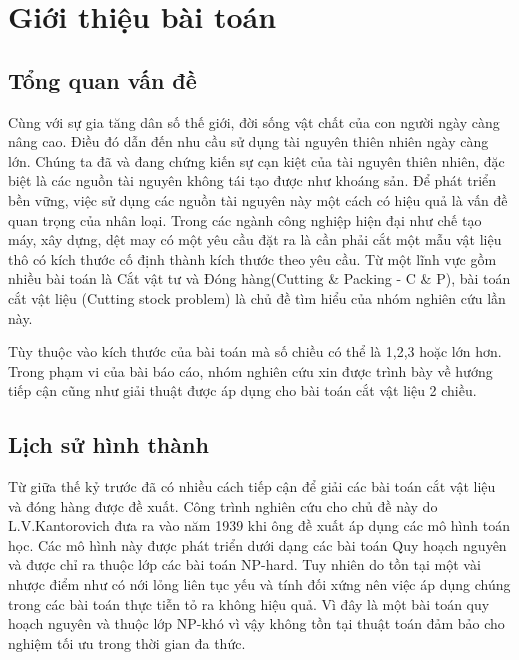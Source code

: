 \documentclass[a4paper]{article}
\begin{document}
\tableofcontents
\newpage


\section{Giới thiệu bài toán}
\subsection{Tổng quan vấn đề}
\hspace{11pt}
Cùng với sự gia tăng dân số thế giới, đời sống vật chất của con người ngày càng nâng cao. Điều đó dẫn đến nhu cầu sử dụng tài nguyên thiên nhiên ngày càng lớn. Chúng ta đã và đang chứng kiến sự cạn kiệt của tài nguyên thiên nhiên, đặc biệt là các nguồn tài nguyên không tái tạo được như khoáng sản. Để phát triển bền vững, việc sử dụng các nguồn tài nguyên này một cách có hiệu quả là vấn đề quan trọng của nhân loại. Trong các ngành công nghiệp hiện đại như chế tạo máy, xây dựng, dệt may có một yêu cầu đặt ra là cần phải cắt một mẫu vật liệu thô có kích thước cố định thành kích thước theo yêu cầu. Từ một lĩnh vực gồm nhiều bài toán là Cắt vật tư và Đóng hàng(Cutting \& Packing - C \& P), bài toán cắt vật liệu (Cutting stock problem) là chủ đề tìm hiểu của nhóm nghiên cứu lần này. 

\hspace{11pt}
Tùy thuộc vào kích thước của bài toán mà số chiều có thể là 1,2,3 hoặc lớn hơn. Trong phạm vi của bài báo cáo, nhóm nghiên cứu xin được trình bày về hướng tiếp cận cũng như giải thuật được áp dụng cho bài toán cắt vật liệu 2 chiều.

\subsection{Lịch sử hình thành}
\hspace{11pt}
Từ giữa thế kỷ trước đã có nhiều cách tiếp cận để giải các bài toán cắt vật liệu và đóng hàng được đề xuất. Công trình nghiên cứu cho chủ đề này do L.V.Kantorovich đưa ra vào năm 1939 khi ông đề xuất áp dụng các mô hình toán học. Các mô hình này được phát triển dưới dạng các bài toán Quy hoạch nguyên và được chỉ ra thuộc lớp các bài toán NP-hard. Tuy nhiên do tồn tại một vài nhược điểm như có nới lỏng liên tục yếu và tính đối xứng nên việc áp dụng chúng trong các bài toán thực tiễn tỏ ra không hiệu quả.
Vì đây là một bài toán quy hoạch nguyên và thuộc lớp NP-khó vì vậy không tồn tại thuật toán đảm bảo cho nghiệm tối ưu trong thời gian đa thức.
\end{document}
